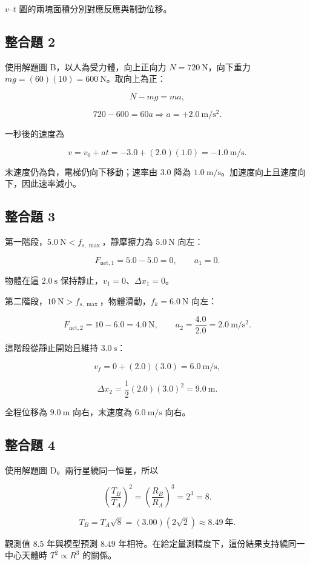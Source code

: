 \documentclass[11pt,a4paper]{article}
\begin{document}
\(v\)--\(t\) 圖的兩塊面積分別對應反應與制動位移。

\subsection{整合題 2}\label{ux6574ux5408ux984c-2}

使用解題圖 B，以人為受力體，向上正向力 \(N=720\ \mathrm N\)，向下重力 \(mg=(60)(10)=600\ \mathrm N\)。取向上為正：

\[
N-mg=ma,
\]

\[
720-600=60a
\Rightarrow a=+2.0\ \mathrm{m/s^2}.
\]

一秒後的速度為

\[
v=v_0+at=-3.0+(2.0)(1.0)=-1.0\ \mathrm{m/s}.
\]

末速度仍為負，電梯仍向下移動；速率由 \(3.0\) 降為 \(1.0\ \mathrm{m/s}\)。加速度向上且速度向下，因此速率減小。

\subsection{整合題 3}\label{ux6574ux5408ux984c-3}

第一階段，\(5.0\ \mathrm N<f_{s,\max}\)，靜摩擦力為 \(5.0\ \mathrm N\) 向左：

\[
F_{\mathrm{net},1}=5.0-5.0=0,
\qquad a_1=0.
\]

物體在這 \(2.0\ \mathrm s\) 保持靜止，\(v_1=0\)、\(\Delta x_1=0\)。

第二階段，\(10\ \mathrm N>f_{s,\max}\)，物體滑動，\(f_k=6.0\ \mathrm N\) 向左：

\[
F_{\mathrm{net},2}=10-6.0=4.0\ \mathrm N,
\qquad
a_2=\frac{4.0}{2.0}=2.0\ \mathrm{m/s^2}.
\]

這階段從靜止開始且維持 \(3.0\ \mathrm s\)：

\[
v_f=0+(2.0)(3.0)=6.0\ \mathrm{m/s},
\]

\[
\Delta x_2=\frac{1}{2}(2.0)(3.0)^2=9.0\ \mathrm m.
\]

全程位移為 \(9.0\ \mathrm m\) 向右，末速度為 \(6.0\ \mathrm{m/s}\) 向右。

\subsection{整合題 4}\label{ux6574ux5408ux984c-4}

使用解題圖 D。兩行星繞同一恒星，所以

\[
\left(\frac{T_B}{T_A}\right)^2
=\left(\frac{R_B}{R_A}\right)^3
=2^3=8.
\]

\[
T_B=T_A\sqrt8
=(3.00)(2\sqrt2)
\approx8.49\ \text{年}.
\]

觀測值 \(8.5\) 年與模型預測 \(8.49\) 年相符。在給定量測精度下，這份結果支持繞同一中心天體時 \(T^2\propto R^3\) 的關係。
\end{document}
